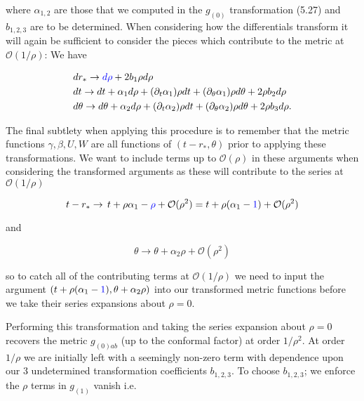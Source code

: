 \documentclass[a4paper,11pt]{article}
\numberwithin{equation}{section}
\begin{document}
\noindent where $\alpha_{1,2}$ are those that we computed in the $g_{(0)}$ transformation (5.27) and $b_{1,2,3}$ are to be determined. When considering how the differentials transform it will again be sufficient to consider the pieces which contribute to the metric at $\mathcal{O}(1/\rho)$: We have

\begin{subequations}
\begin{align}
&dr_* \rightarrow  \textcolor{blue}{d\rho} +2b_1\rho d\rho \\
&dt \rightarrow dt + \alpha_1 d\rho + (\partial_t \alpha_1) \rho dt +  (\partial_{\theta} \alpha_1) \rho d\theta + 2\rho b_2 d\rho \\
&d\theta \rightarrow d\theta  + \alpha_2 d\rho + (\partial_t \alpha_2) \rho dt +  (\partial_{\theta} \alpha_2) \rho d\theta + 2\rho b_3 d\rho.
\end{align}
\end{subequations}

The final subtlety when applying this procedure is to remember that the metric functions $\gamma, \beta, U, W$ are all functions of $(t-r_* , \theta)$ prior to applying these transformations. We want to include terms up to $\mathcal{O}(\rho)$ in these arguments when considering the transformed arguments as these will contribute to the series at $\mathcal{O}(1/\rho)$ 

\begin{equation} 
t-r_* \rightarrow  \, t+\rho\alpha_1 - \textcolor{blue}{\rho}+\mathcal{O}(\rho^2)=t+\rho(\alpha_1-\textcolor{blue}{1})+\mathcal{O}(\rho^2)
\end{equation}

\noindent and 

\begin{equation}
\theta \rightarrow  \theta +\alpha_2 \rho + \mathcal{O}(\rho^2)
\end{equation}

\noindent so to catch all of the contributing terms at $\mathcal{O}(1/\rho)$ we need to input the argument $(t+\rho(\alpha_1-\textcolor{blue}{1}), \theta+ \alpha_2 \rho)$ into our transformed metric functions before we take their series expansions about $\rho=0$. \par

Performing this transformation and taking the series expansion about $\rho=0$ recovers the metric $g_{(0)ab}$ (up to the conformal factor) at order $1/\rho^2$. At order $1/\rho$ we are initially left with a seemingly non-zero term with dependence upon our 3 undetermined transformation coefficients $b_{1,2,3}$. To choose $b_{1,2,3}$; we enforce the $\rho$ terms in $g_{(1)}$ vanish i.e.
\end{document}
